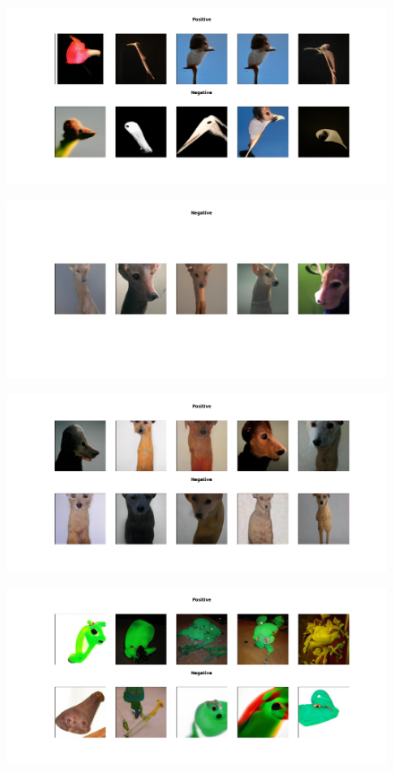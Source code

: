 \documentclass[12pt,a4paper,openany]{book}
\begin{document}
\begin{figure}[ht!]
    \centering
    \includegraphics[scale=0.4]{figs/cifar10_examples/bird.png}
\end{figure}
\begin{figure}[ht!]
    \centering
    \includegraphics[scale=0.4]{figs/cifar10_examples/deer.png}
\end{figure}
\begin{figure}[ht!]
    \centering
    \includegraphics[scale=0.4]{figs/cifar10_examples/dog.png}
\end{figure}
\begin{figure}[ht!]
    \centering
    \includegraphics[scale=0.4]{figs/cifar10_examples/frog.png}
\end{figure}
\end{document}
